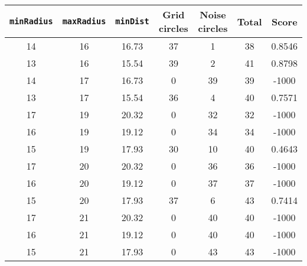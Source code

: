 \documentclass[letterpaper, 12pt]{article}
\begin{document}
\begin{longtable}{|c|c|c|c|c|c|c|}
\hline
\textbf{\texttt{minRadius}} & \textbf{\texttt{maxRadius}} & \textbf{\texttt{minDist}} & \textbf{Grid circles} & \textbf{Noise circles} & \textbf{Total} & \textbf{Score} \\
\hline
14 & 16 & 16.73 & 37 & 1 & 38 & 0.8546 \\
\hline
13 & 16 & 15.54 & 39 & 2 & 41 & 0.8798 \\
\hline
14 & 17 & 16.73 & 0 & 39 & 39 & -1000 \\
\hline
13 & 17 & 15.54 & 36 & 4 & 40 & 0.7571 \\
\hline
17 & 19 & 20.32 & 0 & 32 & 32 & -1000 \\
\hline
16 & 19 & 19.12 & 0 & 34 & 34 & -1000 \\
\hline
15 & 19 & 17.93 & 30 & 10 & 40 & 0.4643 \\
\hline
17 & 20 & 20.32 & 0 & 36 & 36 & -1000 \\
\hline
16 & 20 & 19.12 & 0 & 37 & 37 & -1000 \\
\hline
15 & 20 & 17.93 & 37 & 6 & 43 & 0.7414 \\
\hline
17 & 21 & 20.32 & 0 & 40 & 40 & -1000 \\
\hline
16 & 21 & 19.12 & 0 & 40 & 40 & -1000 \\
\hline
15 & 21 & 17.93 & 0 & 43 & 43 & -1000 \\
\hline
\end{longtable}
\end{document}
